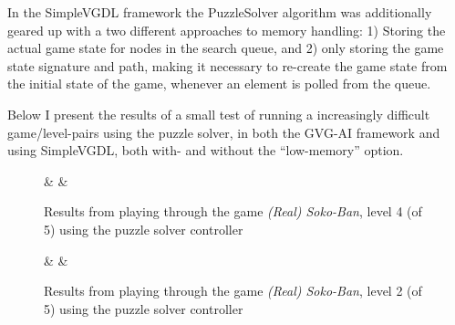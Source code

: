 \documentclass[a4paper,titlepage,final]{report}
\begin{document}
In the SimpleVGDL framework the PuzzleSolver algorithm was additionally geared up with a two different approaches to memory handling: 1) Storing the actual game state for nodes in the search queue, and 2) only storing the game state signature and path, making it necessary to re-create the game state from the initial state of the game, whenever an element is polled from the queue.

Below I present the results of a small test of running a increasingly difficult game/level-pairs using the puzzle solver, in both the GVG-AI framework and using SimpleVGDL, both with- and without the ``low-memory'' option.

\begin{figure}[!ht]
\centering
{}%
{\Framwork & \Time & \Space}%
\caption{Results from playing through the game \textit{(Real) Soko-Ban}, level 4 (of 5) using the puzzle solver controller}
\label{table:fastvgdlSoko-Ban3}
\end{figure}

 \begin{figure}[!ht]
\centering
{}%
{\Framwork & \Time & \Space}%
\caption{Results from playing through the game \textit{(Real) Soko-Ban}, level 2 (of 5) using the puzzle solver controller}\label{table:fastvgdlSoko-Ban1}
\end{figure}
\end{document}

